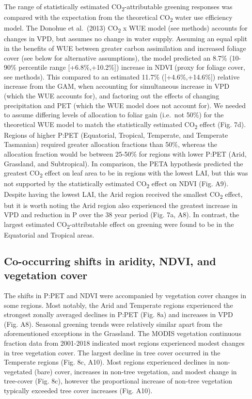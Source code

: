 \documentclass[gc, manuscript]{copernicus}
\begin{document}
The range of statistically estimated CO\textsubscript{2}-attributable
greening responses was compared with the expectation from the
theoretical CO\textsubscript{2} water use efficiency model. The Donohue
et al.~(2013) CO\textsubscript{2} x WUE model (see methods) accounts for
changes in VPD, but assumes no change in water supply. Assuming an equal
split in the benefits of WUE between greater carbon assimilation and
increased foliage cover (see below for alternative assumptions), the
model predicted an 8.7\% (10-90\% percentile range {[}+6.8\%,+10.2\%{]})
increase in NDVI (proxy for foliage cover, see methods). This compared
to an estimated 11.7\% ({[}+4.6\%,+14.6\%{]}) relative increase from the
GAM, when accounting for simultaneous increase in VPD (which the WUE
accounts for), and factoring out the effects of changing precipitation
and PET (which the WUE model does not account for). We needed to assume
differing levels of allocation to foliar gain (i.e.~not 50\%) for the
theoretical WUE model to match the statistically estimated
CO\textsubscript{2} effect (Fig. 7d). Regions of higher P:PET
(Equatorial, Tropical, Temperate, and Temperate Tasmanian) required
greater allocation fractions than 50\%, whereas the allocation fraction
would be between 25-50\% for regions with lower P:PET (Arid, Grassland,
and Subtropical). In comparison, the PETA hypothesis
\citep{donohue_etal17} predicted the greatest CO\textsubscript{2} effect
on leaf area to be in regions with the lowest LAI, but this was not
supported by the statistically estimated CO\textsubscript{2} effect on
NDVI (Fig. A9). Despite having the lowest LAI, the Arid region received
the smallest CO\textsubscript{2} effect, but it is worth noting the Arid
region also experienced the greatest increase in VPD and reduction in P
over the 38 year period (Fig. 7a, A8). In contrast, the largest
estimated CO\textsubscript{2}-attributable effect on greening were found
to be in the Equatorial and Tropical areas.

\subsection{Co-occurring shifts in aridity, NDVI, and vegetation cover}

The shifts in P:PET and NDVI were accompanied by vegetation cover
changes in some regions. Most notably, the Arid and Temperate regions
experienced the strongest zonally averaged declines in P:PET (Fig. 8a)
and increases in VPD (Fig. A8). Seasonal greening trends were relatively
similar apart from the aforementioned exceptions in the Grassland. The
MODIS vegetation continuous fraction data from 2001-2018 indicated most
regions experienced modest changes in tree vegetation cover. The largest
decline in tree cover occurred in the Temperate regions (Fig. 8c, A10).
Most regions experienced declines in non-vegetated (bare) cover,
increases in non-tree vegetation, and modest change in tree-cover (Fig.
8c), however the proportional increase of non-tree vegetation typically
exceeded tree cover increases (Fig. A10).
\end{document}
